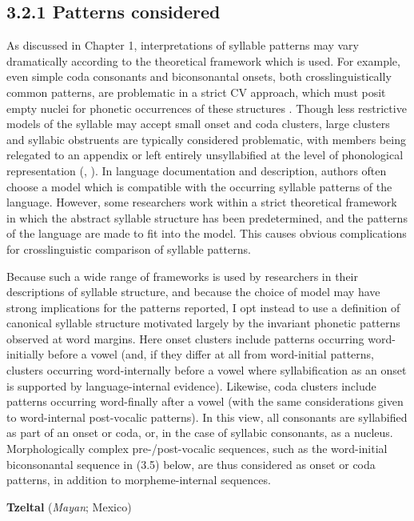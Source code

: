 \subsection{3.2.1 Patterns considered}

  As discussed in Chapter 1, interpretations of syllable patterns may vary dramatically according to the theoretical framework which is used. For example, even simple coda consonants and biconsonantal onsets, both crosslinguistically common patterns, are problematic in a strict CV approach, which must posit empty nuclei for phonetic occurrences of these structures \citep{Lowenstamm1996}. Though less restrictive models of the syllable may accept small onset and coda clusters, large clusters and syllabic obstruents are typically considered problematic, with members being relegated to an appendix or left entirely unsyllabified at the level of phonological representation (\citealt{VauxWolfe2009}, \citealt{Bagemihl1991}). In language documentation and description, authors often choose a model which is compatible with the occurring syllable patterns of the language. However, some researchers work within a strict theoretical framework in which the abstract syllable structure has been predetermined, and the patterns of the language are made to fit into the model. This causes obvious complications for crosslinguistic comparison of syllable patterns.

  Because such a wide range of frameworks is used by researchers in their descriptions of syllable structure, and because the choice of model may have strong implications for the patterns reported, I opt instead to use a definition of canonical syllable structure motivated largely by the invariant phonetic patterns observed at word margins. Here onset clusters include patterns occurring word-initially before a vowel (and, if they differ at all from word-initial patterns, clusters occurring word-internally before a vowel where syllabification as an onset is supported by language-internal evidence). Likewise, coda clusters include patterns occurring word-finally after a vowel (with the same considerations given to word-internal post-vocalic patterns). In this view, all consonants are syllabified as part of an onset or coda, or, in the case of syllabic consonants, as a nucleus. Morphologically complex pre-/post-vocalic sequences, such as the word-initial biconsonantal sequence in (3.5) below, are thus considered as onset or coda patterns, in addition to morpheme-internal sequences.

\ea\label{ex:(3.5)}
   \textbf{Tzeltal} (\textit{Mayan}; Mexico)

